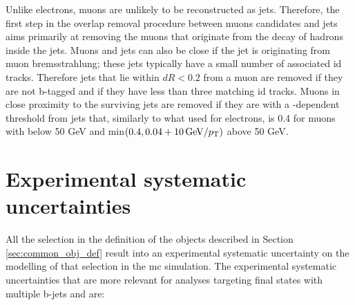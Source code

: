 Unlike electrons, muons are unlikely to be reconstructed as jets. Therefore, the first step in the overlap removal procedure between muons candidates and jets 
aims primarily at removing the muons that originate from the decay of hadrons inside the jets. 
Muons and jets can also be close if the jet is originating from muon bremsstrahlung; these jets typically have a small number of associated \gls{id} tracks.
Therefore jets that lie within $dR < 0.2$ from a muon are removed if they are not b-tagged and if they have less than three matching \gls{id} tracks. 
Muons in close proximity to the surviving jets are removed if they are with a \pt-dependent threshold from jets that, similarly to what used for electrons, is 
0.4 for muons with \pt below 50 GeV and min$(0.4, 0.04 + 10 \, {\rm{GeV}}/p_{\rm T})$ above 50 GeV. 


\section{Experimental systematic uncertainties}
\label{sec:common_syst}

All the selection in the definition of the objects described in Section \ref{sec:common_obj_def} result into an experimental systematic uncertainty on the modelling of that selection in 
the \gls{mc} simulation. The experimental systematic uncertainties that are more relevant for analyses targeting final states with multiple b-jets and \met are:

